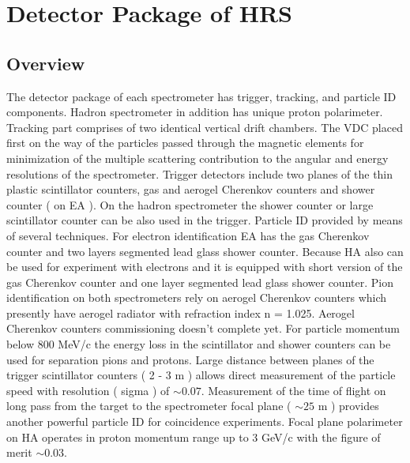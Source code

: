 \documentclass[12pt]{article}
\begin{document}
\section{Detector Package of HRS}
\subsection{Overview}

The detector package of each spectrometer has trigger, tracking, and particle 
ID components. Hadron spectrometer in addition has unique proton polarimeter.
Tracking part comprises of two identical vertical drift chambers. The VDC
placed first on the way of the particles passed through the magnetic 
elements for minimization of the multiple scattering contribution to the angular and 
energy resolutions of the spectrometer. Trigger detectors include two planes of the
thin plastic scintillator counters, gas and aerogel Cherenkov counters and shower 
counter ( on EA ). On the hadron spectrometer the shower counter or large scintillator counter 
can be also used in the trigger. Particle ID provided by means of several techniques. 
For electron identification EA has the gas Cherenkov counter and two layers segmented 
lead glass shower counter. Because HA also can be used for experiment with electrons 
and it is equipped with short version of the gas Cherenkov counter and one layer segmented 
lead glass shower counter. Pion identification on both spectrometers rely on aerogel 
Cherenkov counters which presently have aerogel radiator with refraction index n = 1.025. 
Aerogel Cherenkov counters commissioning doesn't complete yet. For particle momentum  
below 800 MeV/c the energy loss in the scintillator and shower counters can be used for 
separation pions and protons. Large distance between planes of the trigger scintillator 
counters ( 2 - 3 m ) allows direct measurement of the particle speed with resolution ( sigma )
of $\sim 0.07$. Measurement of the time of flight on long pass from the target to the 
spectrometer focal plane ( $\sim 25$ m ) provides another powerful particle ID for 
coincidence experiments.
Focal plane polarimeter on HA operates in proton momentum range up to 3 GeV/c with 
the figure of merit $\sim 0.03$.\\
\end{document}
